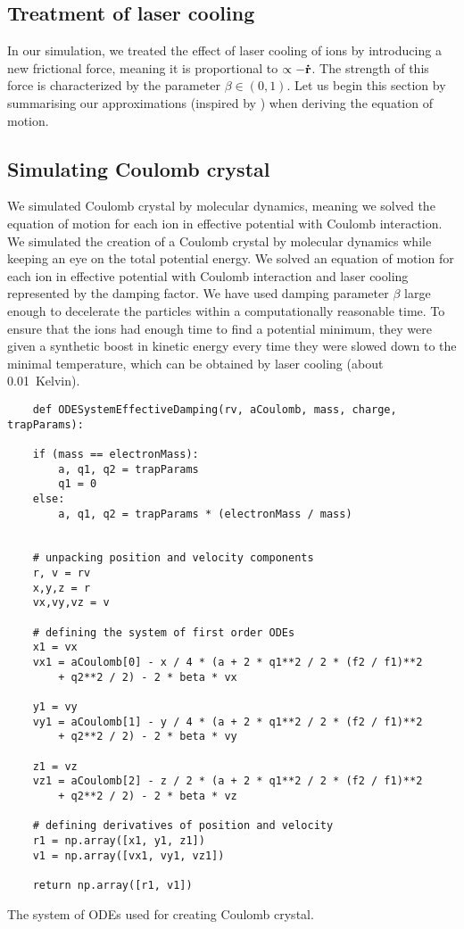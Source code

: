 \subsection{Treatment of laser cooling}
In our simulation, we treated the effect of laser cooling of ions by introducing a new frictional force, meaning it is proportional to $\propto - \vb{\dot{r}}$. The strength of this force is characterized by the parameter $\beta \in (0,1)$. 
Let us begin this section by summarising our approximations (inspired by \cite{Friedman_1982}) when deriving the equation of motion. 

\subsection{Simulating Coulomb crystal}
We simulated Coulomb crystal by molecular dynamics, meaning we solved the equation of motion for each ion in effective potential with Coulomb interaction. 
We simulated the creation of a Coulomb crystal by molecular dynamics while keeping an eye on the total potential energy. We solved an equation of motion for each ion in effective potential with Coulomb interaction and laser cooling represented by the damping factor. We have used damping parameter $\beta$ large enough to decelerate the particles within a computationally reasonable time. To ensure that the ions had enough time to find a potential minimum, they were given a synthetic boost in kinetic energy every time they were slowed down to the minimal temperature, which can be obtained by laser cooling (about \SI{0.01}{Kelvin}). 

\begin{listing}[H]
\begin{lstlisting}
	def ODESystemEffectiveDamping(rv, aCoulomb, mass, charge, trapParams):

    if (mass == electronMass):        
        a, q1, q2 = trapParams
        q1 = 0
    else:
        a, q1, q2 = trapParams * (electronMass / mass)
    
	    
    # unpacking position and velocity components
    r, v = rv
    x,y,z = r
    vx,vy,vz = v
    
    # defining the system of first order ODEs
    x1 = vx
    vx1 = aCoulomb[0] - x / 4 * (a + 2 * q1**2 / 2 * (f2 / f1)**2 
    	+ q2**2 / 2) - 2 * beta * vx
    
    y1 = vy
    vy1 = aCoulomb[1] - y / 4 * (a + 2 * q1**2 / 2 * (f2 / f1)**2 
    	+ q2**2 / 2) - 2 * beta * vy
    
    z1 = vz
    vz1 = aCoulomb[2] - z / 2 * (a + 2 * q1**2 / 2 * (f2 / f1)**2 
    	+ q2**2 / 2) - 2 * beta * vz
    
	# defining derivatives of position and velocity 
    r1 = np.array([x1, y1, z1])
    v1 = np.array([vx1, vy1, vz1])

    return np.array([r1, v1])	    
\end{lstlisting}
\caption{The system of ODEs used for creating Coulomb crystal.}
\label{lst:crystal}
\end{listing}